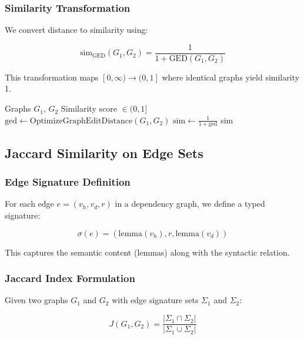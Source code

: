 \documentclass[11pt,a4paper]{article}
\begin{document}
\subsubsection{Similarity Transformation}

We convert distance to similarity using:

\begin{equation}
\text{sim}_{\text{GED}}(G_1, G_2) = \frac{1}{1 + \text{GED}(G_1, G_2)}
\end{equation}

This transformation maps $[0, \infty) \to (0, 1]$ where identical graphs yield similarity 1.

\begin{algorithm}[H]
\caption{GED-based Similarity}
\begin{algorithmic}[1]
\Require Graphs $G_1$, $G_2$
\Ensure Similarity score $\in (0, 1]$
\State $\text{ged} \gets \text{OptimizeGraphEditDistance}(G_1, G_2)$
\State $\text{sim} \gets \frac{1}{1 + \text{ged}}$
\State \Return sim
\end{algorithmic}
\end{algorithm}

\subsection{Jaccard Similarity on Edge Sets}

\subsubsection{Edge Signature Definition}

For each edge $e = (v_h, v_d, r)$ in a dependency graph, we define a typed signature:

\begin{equation}
\sigma(e) = (\text{lemma}(v_h), r, \text{lemma}(v_d))
\end{equation}

This captures the semantic content (lemmas) along with the syntactic relation.

\subsubsection{Jaccard Index Formulation}

Given two graphs $G_1$ and $G_2$ with edge signature sets $\Sigma_1$ and $\Sigma_2$:

\begin{equation}
J(G_1, G_2) = \frac{|\Sigma_1 \cap \Sigma_2|}{|\Sigma_1 \cup \Sigma_2|}
\end{equation}
\end{document}
